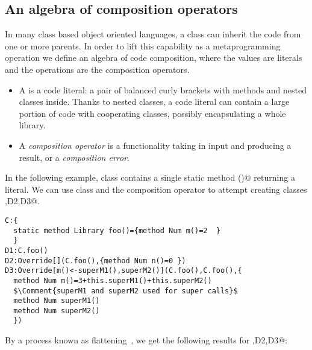 
\subsection*{An algebra of composition operators}

In many class based object oriented languages, a class can inherit the code
from one or more parents.
In order to lift this capability as a metaprogramming operation 
we define an algebra of code composition, where the values
are \Q@Library@ literals and the operations are the composition operators.

\begin{itemize}
\item A \Q@Library@ is a code literal:
a pair of balanced curly brackets with methods and nested classes inside.
Thanks to nested classes, a code literal can contain a large portion of code
with cooperating classes, possibly encapsulating a whole library.
\item A \emph{composition operator}
is a functionality taking in input \Q@Library@s and producing a \Q@Library@
result, or a \emph{composition error}.
\end{itemize}


In the following example, class \Q@C@ contains a single static 
method \Q@foo()@ returning a \Q@Library@ literal.
We can use class \Q@C@ and the \Q@Override@ composition operator to
attempt creating classes ,D2,D3@.

\begin{lstlisting}
C:{
  static method Library foo()={method Num m()=2  }  
  }
D1:C.foo()
D2:Override[](C.foo(),{method Num n()=0 })
D3:Override[m()<-superM1(),superM2()](C.foo(),C.foo(),{
  method Num m()=3+this.superM1()+this.superM2()
  $\Comment{superM1 and superM2 used for super calls}$
  method Num superM1()
  method Num superM2()
  })
\end{lstlisting}

By a process known as flattening~\cite{scharli2003traits}, we get the following results for ,D2,D3@:

